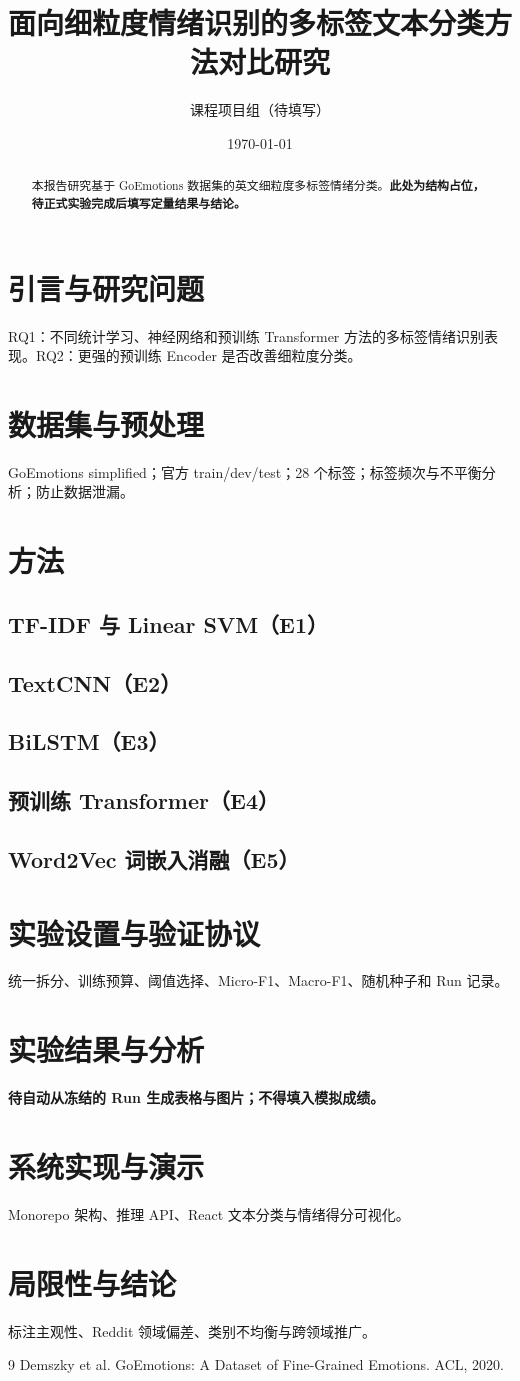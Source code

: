 \documentclass[11pt,a4paper]{ctexart}
\title{面向细粒度情绪识别的多标签文本分类方法对比研究}
\author{课程项目组（待填写）}
\date{\today}
\begin{document}
\maketitle
\begin{abstract}
本报告研究基于 GoEmotions 数据集的英文细粒度多标签情绪分类。\textbf{此处为结构占位，待正式实验完成后填写定量结果与结论。}
\end{abstract}
\section{引言与研究问题}
RQ1：不同统计学习、神经网络和预训练 Transformer 方法的多标签情绪识别表现。RQ2：更强的预训练 Encoder 是否改善细粒度分类。
\section{数据集与预处理}
GoEmotions simplified；官方 train/dev/test；28 个标签；标签频次与不平衡分析；防止数据泄漏。
\section{方法}
\subsection{TF-IDF 与 Linear SVM（E1）}
\subsection{TextCNN（E2）}
\subsection{BiLSTM（E3）}
\subsection{预训练 Transformer（E4）}
\subsection{Word2Vec 词嵌入消融（E5）}
\section{实验设置与验证协议}
统一拆分、训练预算、阈值选择、Micro-F1、Macro-F1、随机种子和 Run 记录。
\section{实验结果与分析}
\textbf{待自动从冻结的 Run 生成表格与图片；不得填入模拟成绩。}
\section{系统实现与演示}
Monorepo 架构、推理 API、React 文本分类与情绪得分可视化。
\section{局限性与结论}
标注主观性、Reddit 领域偏差、类别不均衡与跨领域推广。
\begin{thebibliography}{9}
 Demszky et al. GoEmotions: A Dataset of Fine-Grained Emotions. ACL, 2020.
\end{thebibliography}
\end{document}
